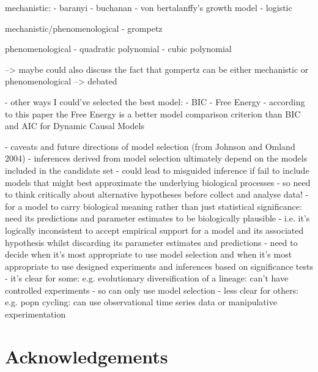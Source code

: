 \documentclass[11pt]{article}
\begin{document}
	mechanistic:
	- baranyi
	- buchanan
	- von bertalanffy's growth model
	- logistic
	
	mechanistic/phenomenological
	- grompetz
	
	phenomenological
	- quadratic polynomial
	- cubic polynomial
	
	--> maybe could also discuss the fact that gompertz can be either mechanistic or phenomenological --> debated
	
	- other ways I could've selected the best model:
	- BIC
	- Free Energy - according to this paper the Free Energy is a better model comparison criterion than BIC and AIC for Dynamic Causal Models \cite{penny2012comparing}
	
	- caveats and future directions of model selection (from Johnson and Omland 2004) \cite{johnson2004model}
	- inferences derived from model selection ultimately depend on the models included in the candidate set
	- could lead to misguided inference if fail to include models that might best approximate the underlying biological processes
	- so need to think critically about alternative hypotheses before collect and analyse data!
	- for a model to carry biological meaning rather than just statistical significance: need its predictions and parameter estimates to be biologically plausible
	- i.e. it's logically inconsistent to accept empirical support for a model and its associated hypothesis whilst discarding its parameter estimates and predictions
	- need to decide when it's most appropriate to use model selection and when it's most appropriate to use designed experiments and inferences based on significance tests
	- it's clear for some: e.g. evolutionary diversification of a lineage: can't have controlled experiments - so can only use model selection 
	- less clear for others: e.g. popn cycling: can use observational time series data or manipulative experimentation
	
	
	
	\section{Acknowledgements}
	
	
	
\end{document}
